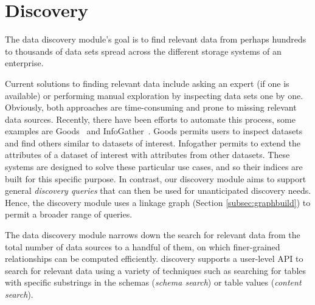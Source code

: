 \section{Discovery}
\label{sec:discovery}

The data discovery module's goal is to find relevant data from perhaps hundreds
to thousands of data sets  spread across the different storage systems of an
enterprise.

Current solutions to finding relevant data include asking an expert (if one is
available) or  performing manual exploration by inspecting data sets one by one.
Obviously, both approaches are time-consuming and prone to missing relevant data
sources. Recently, there have been efforts to automate this process, some
examples are Goods~\cite{DBLP:conf/sigmod/HalevyKNOPRW16} and
InfoGather~\cite{DBLP:conf/sigmod/YakoutGCC12}. Goods permits users to inspect
datasets and find others similar to datasets of interest. Infogather permits to
extend the attributes of a dataset of interest with attributes from other
datasets. These systems are designed to solve these particular use cases, and so
their indices are built for this specific purpose. In
contrast, our discovery module aims to support general \emph{discovery queries} that
can then be used for unanticipated discovery needs. Hence, the discovery module
uses a linkage graph (Section \ref{subsec:graphbuild}) to permit a broader range
of queries. 


%


The data discovery module narrows down the search for relevant data from
the total number of data sources to a handful of them, on which finer-grained
relationships can be computed efficiently. \dcv discovery supports a
user-level API to search for relevant data using a variety of techniques such as
searching for tables with specific substrings in the schemas ({\it schema
search}) or table values ({\it content search}). 

